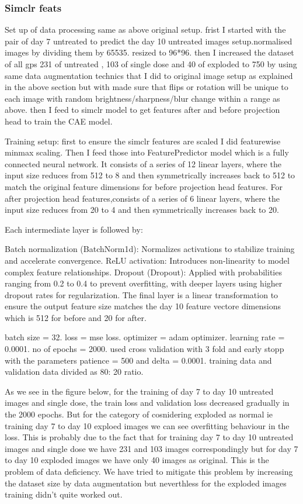 \subsubsection*{Simclr feats}
Set up of data processing same as above original setup.
frist I started with the pair of day 7 untreated to predict the day 10 untreated images setup.normalised images by dividing them by 65535. resized to 96*96. then
I increased the dataset of all gps 231 of untreated , 103 of single dose and 40 of exploded to 750 by using same data augmentation technics that I did to original image setup as explained in the above section but with made sure that flips or rotation will be unique to each image with random brightness/sharpness/blur change within a range as above. then I feed to simclr model 
to get features after and before projection head to train the CAE model. 

Training setup: first to ensure the simclr features are scaled I did featurewise minmax scaling. Then I feed those into FeaturePredictor model which is a fully 
connected neural network. It consists of a series of 12 linear layers, where the input size reduces from 512 to 8 and then symmetrically increases back to 512 to
 match the original feature dimensions for before projection head features. For after projection head features,consists of a series of 6 linear layers, where the 
 input size reduces from 20 to 4 and then symmetrically increases back to 20.

Each intermediate layer is followed by:

Batch normalization (BatchNorm1d): Normalizes activations to stabilize training and accelerate convergence.
ReLU activation: Introduces non-linearity to model complex feature relationships.
Dropout (Dropout): Applied with probabilities ranging from 0.2 to 0.4 to prevent overfitting, with deeper layers using higher dropout rates for regularization.
The final layer is a linear transformation to ensure the output feature size matches the day 10 feature vectore dimensions which is 512 for before and 20 for after.

batch size = 32. loss = mse loss. optimizer = adam optimizer. learning rate = 0.0001. no of epochs = 2000. used cross validation with 3 fold and  early stopp with 
the parameters patience = 500 and delta = 0.0001. training data and validation data divided as 80: 20 ratio.

As we see in the figure below, for the training of day 7 to day 10 untreated images and single dose, the train loss and validation loss decreased gradually  in the 2000 epochs. But for the category of cosnidering exploded as normal ie training  day 7 to day 10 exploed images we can see overfitting behaviour in the loss. This is probably due to the fact that for training day 7 to day 10 untreated images and single dose we have 231 and 103  images correspondingly but for day 7 to day 10 exploded images we have only 40 images as original. This is the problem of data deficiency. We have tried to mitigate this problem by increasing the dataset size by data augmentation but neverthless for the exploded images training didn't quite worked out.


